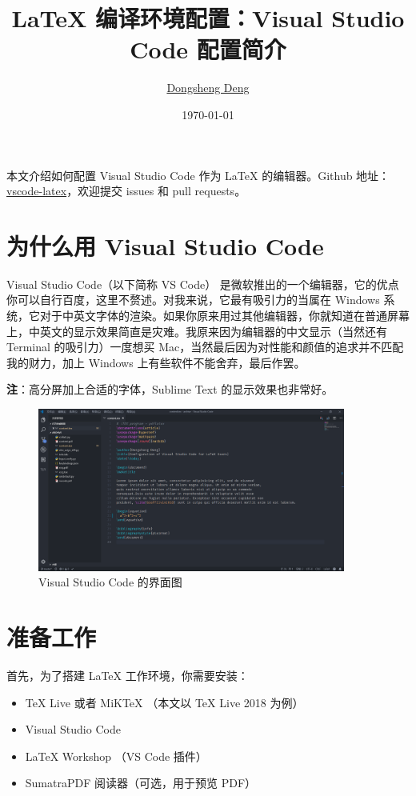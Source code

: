 \documentclass{article}
\title{\bfseries \LaTeX{} 编译环境配置：Visual Studio Code 配置简介}
\author{\href{https://ddswhu.me/}{Dongsheng Deng}}
\date{\today}
\begin{document}
\maketitle

本文介绍如何配置 Visual Studio Code 作为 \LaTeX{} 的编辑器。Github 地址：\href{https://github.com/EthanDeng/vscode-latex}{vscode-latex}，欢迎提交 issues 和 pull requests。

\section{为什么用 Visual Studio Code}
Visual Studio Code（以下简称 VS Code） 是微软推出的一个编辑器，它的优点你可以自行百度，这里不赘述。对我来说，它最有吸引力的当属在 Windows 系统，它对于中英文字体的渲染。如果你原来用过其他编辑器，你就知道在普通屏幕上，中英文的显示效果简直是灾难。我原来因为编辑器的中文显示（当然还有 Terminal 的吸引力）一度想买 Mac，当然最后因为对性能和颜值的追求并不匹配我的财力，加上 Windows 上有些软件不能舍弃，最后作罢。

\textbf{注}：高分屏加上合适的字体，Sublime Text 的显示效果也非常好。

\begin{figure}[htbp]
  \centering
  \includegraphics[width=0.9\textwidth]{vscode.png}
  \caption{Visual Studio Code 的界面图}
  \label{fig:vscode}
\end{figure}



\section{准备工作}
首先，为了搭建 \LaTeX{} 工作环境，你需要安装：

\begin{itemize}
  \item \TeX{} Live 或者 MiKTeX （本文以 \TeX{} Live 2018 为例）
  \item Visual Studio Code
  \item \LaTeX{} Workshop （VS Code 插件）
  \item SumatraPDF 阅读器（可选，用于预览 PDF）
\end{itemize}
\end{document}
